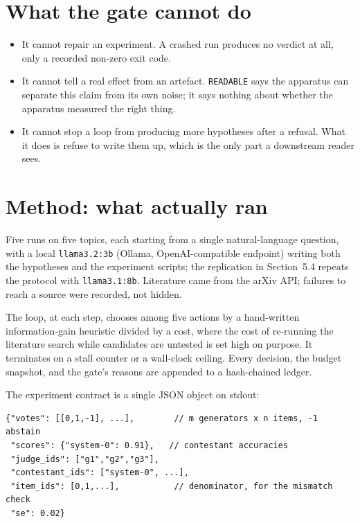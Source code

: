 \documentclass[11pt]{article}
\newcommand{\code}[1]{{\small\texttt{#1}}}
\begin{document}
\section{What the gate cannot do}

\begin{itemize}
\item It cannot repair an experiment. A crashed run produces no verdict at
all, only a recorded non-zero exit code.
\item It cannot tell a real effect from an artefact. \code{READABLE} says the
apparatus can separate this claim from its own noise; it says nothing about
whether the apparatus measured the right thing.
\item It cannot stop a loop from producing more hypotheses after a refusal.
What it does is refuse to write them up, which is the only part a downstream
reader sees.
\end{itemize}

\section{Method: what actually ran}

Five runs on five topics, each starting from a single natural-language
question, with a local \code{llama3.2:3b} (Ollama, OpenAI-compatible endpoint)
writing both the hypotheses and the experiment scripts; the replication in
Section~5.4 repeats the protocol with \code{llama3.1:8b}. Literature came from
the arXiv API; failures to reach a source were recorded, not hidden.

The loop, at each step, chooses among five actions by a hand-written
information-gain heuristic divided by a cost, where the cost of re-running the
literature search while candidates are untested is set high on purpose. It
terminates on a stall counter or a wall-clock ceiling. Every decision, the
budget snapshot, and the gate's reasons are appended to a hash-chained ledger.

The experiment contract is a single JSON object on stdout:

\lstset{basicstyle=\footnotesize\ttfamily,frame=single}
\begin{lstlisting}
{"votes": [[0,1,-1], ...],        // m generators x n items, -1 abstain
 "scores": {"system-0": 0.91},   // contestant accuracies
 "judge_ids": ["g1","g2","g3"],
 "contestant_ids": ["system-0", ...],
 "item_ids": [0,1,...],           // denominator, for the mismatch check
 "se": 0.02}
\end{lstlisting}
\end{document}
